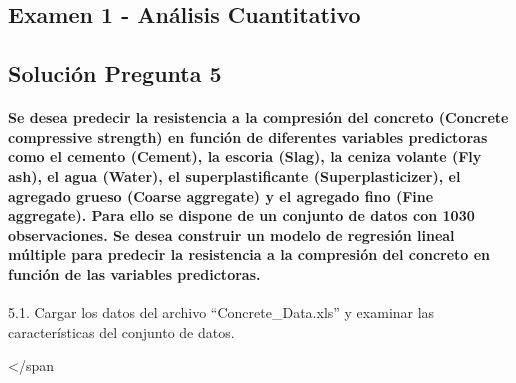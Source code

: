 \documentclass[11pt]{article}
\title{}
\author{}
\date{}
\begin{document}
    
    \maketitle
    
    

    
    \subsection{\texorpdfstring{\textbf{Examen 1 - Análisis
Cuantitativo}}{Examen 1 - Análisis Cuantitativo}}\label{examen-1---anuxe1lisis-cuantitativo}

    \subsection{\texorpdfstring{\textbf{{ Solución Pregunta 5
}}}{ Solución Pregunta 5 }}\label{soluciuxf3n-pregunta-5}

\paragraph{Se desea predecir la resistencia a la compresión del concreto
(Concrete compressive strength) en función de diferentes variables
predictoras como el cemento (Cement), la escoria (Slag), la ceniza
volante (Fly ash), el agua (Water), el superplastificante
(Superplasticizer), el agregado grueso (Coarse aggregate) y el agregado
fino (Fine aggregate). Para ello se dispone de un conjunto de datos con
1030 observaciones. Se desea construir un modelo de regresión lineal
múltiple para predecir la resistencia a la compresión del concreto en
función de las variables
predictoras.}\label{se-desea-predecir-la-resistencia-a-la-compresiuxf3n-del-concreto-concrete-compressive-strength-en-funciuxf3n-de-diferentes-variables-predictoras-como-el-cemento-cement-la-escoria-slag-la-ceniza-volante-fly-ash-el-agua-water-el-superplastificante-superplasticizer-el-agregado-grueso-coarse-aggregate-y-el-agregado-fino-fine-aggregate.-para-ello-se-dispone-de-un-conjunto-de-datos-con-1030-observaciones.-se-desea-construir-un-modelo-de-regresiuxf3n-lineal-muxfaltiple-para-predecir-la-resistencia-a-la-compresiuxf3n-del-concreto-en-funciuxf3n-de-las-variables-predictoras.}

    5.1. Cargar los datos del archivo ``Concrete\_Data.xls'' y examinar las
características del conjunto de datos.

\textless/span
\end{document}

